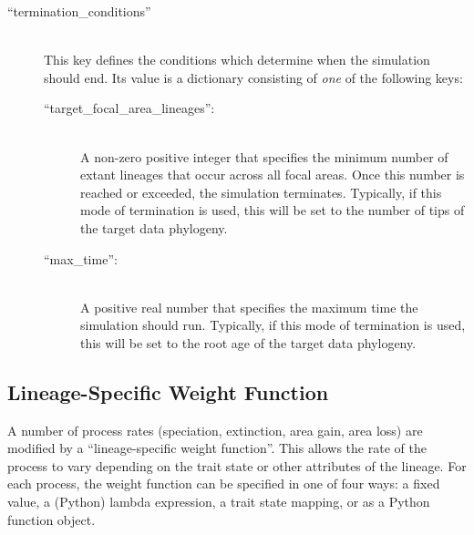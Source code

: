 \documentclass[11pt,openany]{memoir} %
\begin{document}
\begin{description}
    \item[``termination\_conditions'']  \hfill \\
        This key defines the conditions which determine when the simulation should end.
        Its value is a dictionary consisting of \textit{one} of the following keys:
        \begin{description}
            \item[``target\_focal\_area\_lineages'':] \hfill \\
                A non-zero positive integer that specifies the minimum number of extant lineages that occur across all focal areas.
                Once this number is reached or exceeded, the simulation terminates.
                Typically, if this mode of termination is used, this will be set to the number of tips of the target data phylogeny.
            \item[``max\_time'':] \hfill \\
                A positive real number that specifies the maximum time the simulation should run.
                Typically, if this mode of termination is used, this will be set to the root age of the target data phylogeny.
        \end{description}

\end{description}

\subsection{Lineage-Specific Weight Function}

A number of process rates (speciation, extinction, area gain, area loss) are modified by a ``lineage-specific weight function''.
This allows the rate of the process to vary depending on the trait state or other attributes of the lineage.
For each process, the weight function can be specified in one of four ways: a fixed value, a (Python) lambda expression, a trait state mapping, or as a Python function object.
\end{document}
